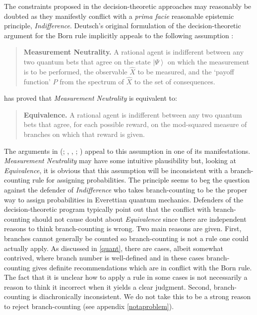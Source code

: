 \documentclass[12pt,onecolumn,secnumarabic,amsmath,amssymb,balancelastpage,nofootinbib]{article}
\newcommand{\ket}[1]{\ensuremath{\left|#1\right\rangle}}
\begin{document}
The constraints proposed in the decision-theoretic approaches may reasonably be doubted as they manifestly conflict with a \emph{prima facie} reasonable epistemic principle, \emph{Indifference}.  Deutsch's original formulation of the decision-theoretic argument for the Born rule implicitly appeals to the following assumption \citep{wallace2003b}:
\begin{quotation}
\noindent\small{\textbf{Measurement Neutrality.}  A rational agent is indifferent between any two quantum bets that agree on the state $\ket{\Psi}$  on which the measurement is to be performed, the observable $\widehat{X}$ to be measured, and the `payoff function' $P$ from the spectrum of $\widehat{X}$ to the set of consequences. \citep[p. 119]{greaves2007}}
\end{quotation}
\citet{wallace2007} has proved that \textit{Measurement Neutrality} is equivalent to:
\begin{quotation}
\noindent\small{\textbf{Equivalence.}  A rational agent is indifferent between any two quantum bets that agree, for each possible reward, on the mod-squared measure of branches on which that reward is given. \citep[p. 119]{greaves2007}}
\end{quotation}
The arguments in (\citealp{deutsch1999}; \citeauthor{greaves2004}, \citeyear{greaves2004}, \citeyear{greaves2007}; \citealp{wallace2003b}) appeal to this assumption in one of its manifestations. \emph{Measurement Neutrality} may have some intuitive plausibility but, looking at \emph{Equivalence}, it is obvious that this assumption will be inconsistent with a branch-counting rule for assigning probabilities.  The principle seems to beg the question against the defender of \emph{Indifference} who takes branch-counting to be the proper way to assign probabilities in Everettian quantum mechanics.  Defenders of the decision-theoretic program typically point out that the conflict with branch-counting should not cause doubt about \emph{Equivalence} since there are independent reasons to think branch-counting is wrong.  Two main reasons are given.  First, branches cannot generally be counted so branch-counting is not a rule one could actually apply.  As discussed in \textsection \ref{quant}, there are cases, albeit somewhat contrived, where branch number is well-defined and in these cases branch-counting gives definite recommendations which are in conflict with the Born rule. {The fact that} it is unclear how to apply a rule in some cases is not necessarily a reason to think it incorrect when it yields a clear judgment.  Second, branch-counting is diachronically inconsistent.  We do not take this to be a strong reason to reject branch-counting (see appendix \ref{notaproblem}).
 
\end{document}
